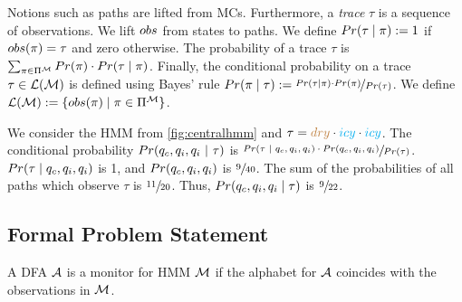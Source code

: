 \documentclass[runningheads]{llncs}
\newcommand{\icy}{{\color{cyan} icy}\xspace}
\newcommand{\dry}{{\color{brown} dry}\xspace}
\newcommand{\defeq}{:=}
\begin{document}
Notions such as paths are lifted from MCs. Furthermore, a \emph{trace} $\tau$ is a sequence of observations. We lift ${obs}$ from states to paths.
We define  $\Prob(\tau\mid\pi) \defeq 1$ if ${obs}(\pi) = \tau$ and zero otherwise. The probability of a trace $\tau$ is $\sum_{\pi\in\Pi^{\mathcal{M}}} {Pr}(\pi) \cdot {Pr}(\tau\mid\pi)$.
Finally, the conditional probability on a trace $\tau\in\mathcal{L}(\mathcal{M})$ is defined using Bayes' rule
$\Prob(\pi\mid\tau) \defeq \nicefrac{\Prob(\tau\mid\pi) \cdot \Prob(\pi)}{\Prob(\tau)}$.
We define $\lang{\mc} \defeq \{ \obsf(\pi) \mid \pi \in \Pi^\mc\}$.
\begin{example}
    We consider the HMM from \cref{fig:centralhmm} and $\tau = \dry\cdot \icy\cdot \icy$. The conditional probability ${Pr}(q_c,q_i,q_i\ |~\tau)$ is $\sfrac{{Pr}(\tau\ |~q_c,q_i,q_i)\cdot {Pr}(q_c,q_i,q_i)}{{Pr}(\tau)}$. ${Pr}(\tau \mid q_c,q_i,q_i)$ is 1, and ${Pr}(q_c,q_i,q_i)$ is $\sfrac{9}{40}$. The sum of the probabilities of all paths which observe $\tau$ is $\sfrac{11}{20}$. Thus, ${Pr}(q_c,q_i,q_i\mid\tau)$ is $\sfrac{9}{22}$.
\end{example}


\subsection{Formal Problem Statement}
\begin{definition}[Monitor]
    A DFA $\mathcal{A}$ is a monitor for HMM $\mathcal{M}$ if the alphabet for $\mathcal{A}$ coincides with the observations in $\mathcal{M}$.
\end{definition}
\end{document}

